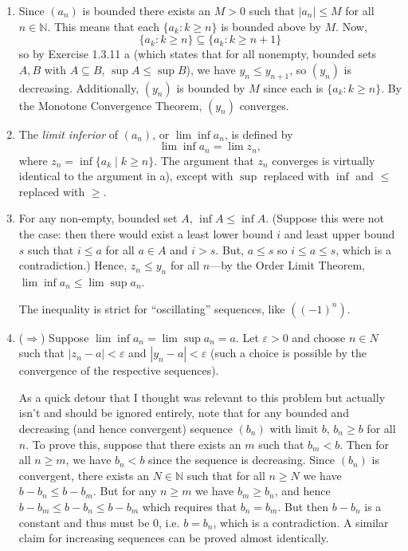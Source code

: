 \documentclass[a4paper]{report}
\newenvironment{ex}[1]
    {\noindent{\large \bf Exercise #1.}}{\vspace{0.5cm}}
\begin{document}
\begin{ex}{2.4.7}
  \begin{enumerate}[label=\alph*)]
    \item  Since $(a_n)$ is bounded there exists an $M > 0$ such that $|a_n| \leq M$ for all $n \in \mathbb{N}$. This means that each $\{a_k : k \geq n\}$ is bounded above by $M$. Now, 
\[
\{a_k : k \geq n\} \subseteq \{a_k : k \geq n +1\}
\]
so by Exercise 1.3.11 a (which states that for all nonempty, bounded sets $A, B$ with $A \subseteq B$, $\sup A \leq \sup B$), we have
$y_n \leq y_{n+1}$, so $(y_n)$ is decreasing. Additionally, $(y_n)$ is bounded by $M$ since each is $\{a_k : k \geq n\}$. By the Monotone Convergence Theorem, $(y_n)$ converges.

  \item The \emph{limit inferior} of $(a_n)$, or $\lim \inf a_n$, is defined by
\[
  \lim \inf a_n = \lim z_n,
\]
where $z_n = \inf\{a_k \mid k \geq n\}$. The argument that $z_n$ converges is virtually identical to the argument in a), except with $\sup$ replaced with $\inf$ and $\leq$ replaced with $\geq$.

\item  For any non-empty, bounded set $A$, $\inf A \leq \inf A$. (Suppose this were not the case: then there would exist a least lower bound $i$ and least upper bound $s$ such that $i \leq a$ for all $a \in A$ and $i > s$. But, $a \leq s$ so $i \leq a \leq s$, which is a contradiction.) Hence, $z_n \leq y_n$ for all $n$---by the Order Limit Theorem, $\lim \inf a_n \leq \lim \sup a_n$.

The inequality is strict for ``oscillating'' sequences, like $((-1)^n)$.

\item ($\Longrightarrow$) Suppose $\lim \inf a_n = \lim \sup a_n = a$. Let $\varepsilon > 0$ and choose $n \in N$ such that $|z_n - a| < \varepsilon$ and $|y_n -a| < \varepsilon$ (such a choice is possible by the convergence of the respective sequences). 

As a quick detour that I thought was relevant to this problem but actually isn't and should be ignored entirely, note that for any bounded and decreasing (and hence convergent) sequence $(b_n)$ with limit $b$, $b_n \geq b$ for all $n$. To prove this, suppose that there exists an $m$ such that $b_m < b$. Then for all $n \geq m$, we have $b_n < b$ since the sequence is decreasing. Since $(b_n)$ is convergent, there exists an $N \in \mathbb{N}$ such that for all $n \geq N$ we have $b - b_n \leq b - b_m$. But for any $n \geq m$ we have
$b_m \geq b_n$, and hence $b - b_m \leq b - b_n \leq b - b_m$ which requires that $b_n = b_m$. But then $b - b_n$ is a constant and thus must be 0, i.e. $b = b_n$, which is a contradiction. A similar claim for increasing sequences can be proved almost identically.


\end{enumerate}
\end{ex}
\end{document}
